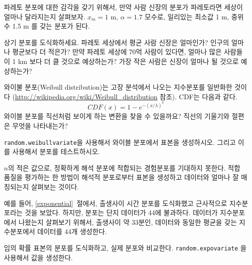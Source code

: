 \begin{exercise}
파레토 분포에 대한 감각을 갖기 위해서,
만약 사람 신장의 분포가 파레토라면 세상이 얼마나 달라지는지 살펴보자.
$x_{m} = 1$ m, $\alpha = 1.7$ 모수로, 일리있는 최소값 1 m, 중위수 1.5 m 를 갖는 
분포가 된다.


상기 분포를 도식화하세요. 파레토 세상에서 평균 사람 신장은 얼마인가?
인구의 얼마나 평균보다 더 적은가?
만약 파레토 세상에 70억 사람이 있다면, 얼마나 많은 사람들이 1 km 보다
더 클 것으로 예상하는가? 가장 작은 사람은 신장이 얼마나 될 것으로 예상하는가?

\end{exercise}


\begin{exercise}
\label{weibull}

와이불 분포(Weibull distribution)는 고장 분석에서 나오는 지수분포를 일반화한 것이다
(\url{http://wikipedia.org/wiki/Weibull_distribution} 참조). CDF는 다음과 같다.
%
\[ CDF(x) = 1 - e^{-(x / \lambda)^k} \]
%
와이블 분포를 직선처럼 보이게 하는 변환을 찾을 수 있을까요?
직선의 기울기와 절편은 무엇을 나타내는가?

{\tt random.weibullvariate}을 사용해서 와이블 분포에서 표본을 생성하시오.
그리고 이를 사용해서 분포를 테스트하시오.

\end{exercise}


\begin{exercise}
$n$의 적은 값으로, 정확하게 해석 분포에 적합되는
경험분포를 기대하지 못한다.
적합 품질을 평가하는 한 방법이 해석적 분포로부터 표본을 생성하고 
데이터와 얼마나 잘 매칭되는지 살펴보는 것이다.


예를 들어, \ref{exponential}~절에서,
출생사이 시간 분포를 도식화했고 근사적으로 지수분포라는 것을 보았다.
하지만, 분포는 단지 데이터가 44에 불과하다.
데이터가 지수분포에서 나왔는지 살펴보기 위해서,
출생사이 약 33분인, 데이터와 동일한 평균을 갖는 지수분포에서 데이터를 44개 생성한다.

임의 확률 표본의 분포를 도식화하고, 실제 분포와 비교한다.
{\tt random.expovariate} 을 사용해서 값을 생성한다.

\end{exercise}

